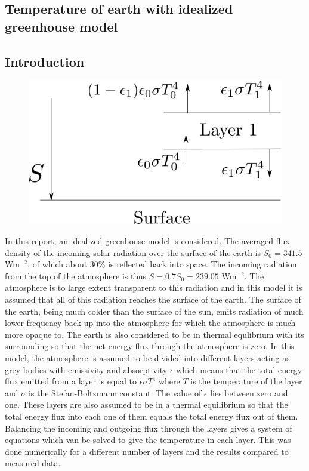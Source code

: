 \documentclass[twocolumn]{article}
\begin{document}
\begin{large}

\section*{Temperature of earth with idealized greenhouse model}
\subsection*{Introduction}
\begin{figure}[b!]
    \includegraphics[scale=0.5]{Layer1.png}
    \caption{}
    \label{11maj1748}
\end{figure}
In this report, an idealized greenhouse model is considered. The averaged flux density of the incoming solar radiation over the surface of the earth is $S_0 = 341.5$ Wm$^{-2}$, of which about $30$\% is reflected back into space. The incoming radiation from the top of the atmosphere is thus $S = 0.7S_0 = 239.05$ Wm$^{-2}$. The atmosphere is to large extent transparent to this radiation and in this model it is assumed that all of this radiation reaches the surface of the earth. The surface of the earth, being much colder than the surface of the sun, emits radiation of much lower frequency back up into the atmosphere for which the atmosphere is much more opaque to.  The earth is also considered to be in thermal equlibrium with its surrounding so that the net energy flux through the atmosphere is zero. In this model, the atmosphere is assumed to be divided into different layers acting as grey bodies with emissivity and absorptivity $\epsilon$ which means that the total energy flux emitted from a layer is equal to $\epsilon\sigma T^4$ where $T$ is the temperature of the layer and $\sigma$ is the Stefan-Boltzmann constant. The value of $\epsilon$ lies between zero and one. These layers are also assumed to be in a thermal equilibrium so that the total energy flux into each one of them equals the total energy flux out of them. Balancing the incoming and outgoing flux through the layers gives a system of equations which van be solved to give the temperature in each layer. This was done numerically for a different number of layers and the results compared to measured data. 


\end{large}
\end{document}
